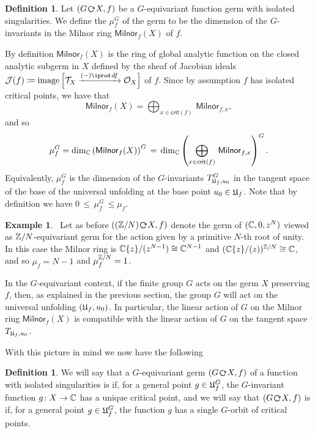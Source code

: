 \documentclass[twoside,leqno]{article}
\numberwithin{equation}{section}
\theoremstyle{plain}
\theoremstyle{definition}
\newtheorem{definition}[equation]{Definition}
\newtheorem{example}[equation]{Example}
\begin{document}
\begin{definition} Let $(G\, \actleft\, X,f)$ be a $G$-equivariant function germ with isolated singularities.
We define the  $\mu_f^{G}$ of the germ  to be the dimension of the $G$-invariants in the Milnor ring $\mathsf{Milnor}_{f}(X)$ of $f$.
\end{definition}

By definition $\mathsf{Milnor}_{f}(X)$ is the ring of global analytic function on the closed analytic subgerm in 
$X$ defined by the sheaf of Jacobian ideals $\mathcal{J}(f) \coloneqq \op{image}\Big[\cT_{X} \xrightarrow{(-)\iprod \, df} \cO_X \Big]$
of $f$. Since by assumption $f$ has isolated critical points, we
have that 
\[
\mathsf{Milnor}_{f}(X) = \bigoplus_{x \in \mathsf{crit}(f)} \, \mathsf{Milnor}_{f,x},
\]
and so
\[
\mu_f^G = \dim_{\mathbb C} \left(\mathsf{Milnor}_{f}(X)\right)^{G} \, = \, 
\dim_\mathbb{C} \left(\bigoplus_{x \in \mathsf{crit}(f)} \, \mathsf{Milnor}_{f,x}\right)^G.
\]
Equivalently, $\mu_{f}^{G}$ is the dimension of the $G$-invariants $T_{\mathfrak{U}_{f},u_{0}}^{G}$ in the 
tangent space of the base of the universal unfolding at the base point $u_{0} \in \mathfrak{U}_{f}$.
Note that by definition we have $0 \, \leq \, \mu_{f}^{G} \, \leq \mu_{f}$.

\begin{example} \ Let as before $((\bbZ/N)\,  \actleft \, X,f)$ denote the 
germ of $(\mathbb C,0,z^{N})$ viewed as $\mathbb Z/N$-equivariant germ for the action given by a primitive $N$-th root of unity.   In this case the Milnor ring is $\mathbb C\{z\}/(z^{N-1}) \cong \mathbb C^{N-1}$ and
$(\mathbb{C}\{z\}/(z))^{\mathbb Z/N} \cong \mathbb C$, 
and so $\mu_{f} = N-1$ and $\mu_{f}^{\mathbb Z/N} =  1$.
\end{example}
 
In the $G$-equivariant context, if the finite group $G$ acts on the germ $X$ preserving $f$, then, as explained in the previous section, the group $G$ will act on the universal unfolding $(\mathfrak{U}_{f},u_{0})$. In particular, the linear action of $G$ on the Milnor ring  $\mathsf{Milnor}_{f}(X)$ is compatible with the linear action of $G$  on the tangent space $T_{\mathfrak{U}_{f},u_{0}}$. 

With this picture in mind we now have the following

\begin{definition}
We will say that a  $G$-equivariant germ  $(G \, \actleft \, X,f)$ of a function with isolated singularities is   if, for a general point $g \in \mathfrak{U}_f^{G}$, the $G$-invariant function $g \colon X \to \mathbb C$ has a unique critical point, and we will say that $(G\, \actleft \, X,f)$ is   if, for a  general point $g \in \mathfrak{U}_f^{G}$, the function $g$  has a single $G$-orbit of critical points.
\end{definition}
\end{document}
